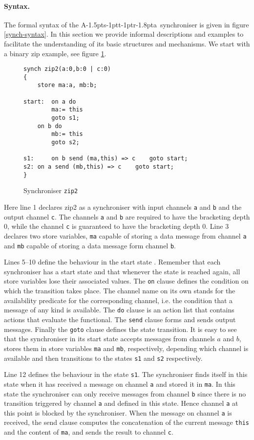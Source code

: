 \documentclass[11pt]{report}
\def\ak{{\textsf{A\kern-1.5pts\kern-1ptt\kern-1ptr\kern-1.8pta}}\kern-2pt{\it K\kern-2ptahn}}
\begin{document}
\paragraph{Syntax.} The formal syntax of the \ak\ synchroniser is given in figure \ref{synch-syntax}. In this section we provide informal descriptions and examples
to facilitate the understanding of its basic structures and mechanisms. We start with a binary zip example,
see figure \ref{zip2}.


\begin{figure}
\lstset{numbers=left, numberstyle=\small, stepnumber=1, numbersep=8pt}
\begin{lstlisting}[frame=single]
synch zip2(a:0,b:0 | c:0)
{
	store ma:a, mb:b;
	
start:	on a do
		ma:= this
		goto s1;
	on b do
		mb:= this
		goto s2;

s1: 	on b send (ma,this) => c 	goto start;
s2:	on a send (mb,this) => c 	goto start;
}
\end{lstlisting}
\caption{Synchroniser {\tt zip2}\label{zip2}}
\end{figure}
Here line 1 declares zip2 as a synchroniser with input channels \verb$a$ and \verb$b$ and the output channel \verb$c$.
The channels \verb$a$ and \verb$b$ are required to have the bracketing depth 0, while the channel \verb$c$ is guaranteed
to have the bracketing depth 0.
Line 3 declares two store variables, \verb$ma$ capable of storing a data message from channel \verb$a$ and \verb$mb$
capable of storing a data message form channel \verb$b$.

Lines 5--10 define the behaviour in the start state . Remember that each synchroniser has a start state and that
whenever the state is reached again, all store variables lose their associated values. The \verb$on$ clause
defines the condition on which the transition takes place. The channel name on its own stands for the availability
predicate for the corresponding channel, i.e. the condition that a message of any kind is available. The \verb$do$
clause is an action list that contains actions that evaluate the functional. The \verb$send$ clause forms and sends
output messages.
Finally the \verb$goto$ clause
defines the state transition. It is easy to see that the synchroniser in its start state accepts messages from channels $a$
and $b$, stores them in store variables \verb$ma$ and \verb$mb$, respectively,  depending which channel is available and then
transitions to the states \verb$s1$ and \verb$s2$ respectively.

Line 12 defines the behaviour in the state \verb$s1$. The synchroniser finds itself in this state when it has received a message
on channel \verb$a$ and stored it in \verb$ma$. In this state the synchroniser can only receive messages from channel \verb$b$ since
there is no transition triggered by channel \verb$a$ and defined in this state. Hence channel \verb$a$ at this point is blocked
by the synchroniser. When the message on channel \verb$a$ is received, the send clause computes the concatenation of the
current message \verb$this$ and the content of \verb$ma$, and sends the result to channel \verb$c$.
\end{document}
